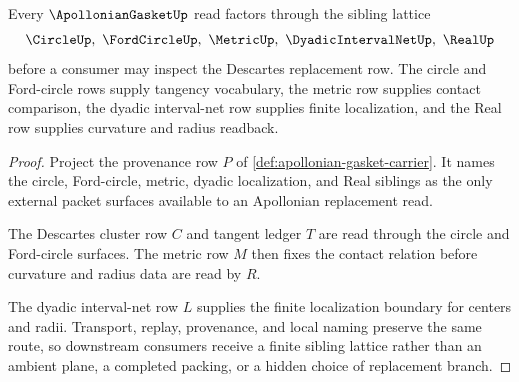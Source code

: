 \begin{theorem}
\label{thm:apollonian-gasket-sibling-lattice}
Every $\ApollonianGasketUp$ read factors through the sibling lattice
$$
\CircleUp,\ \FordCircleUp,\ \MetricUp,\ \DyadicIntervalNetUp,\ \RealUp
$$
before a consumer may inspect the Descartes replacement row. The circle and Ford-circle rows supply tangency vocabulary, the metric row supplies contact comparison, the dyadic interval-net row supplies finite localization, and the Real row supplies curvature and radius readback.
\end{theorem}
\begin{proof}
Project the provenance row $P$ of \autoref{def:apollonian-gasket-carrier}. It names the circle, Ford-circle, metric, dyadic localization, and Real siblings as the only external packet surfaces available to an Apollonian replacement read.

The Descartes cluster row $C$ and tangent ledger $T$ are read through the circle and Ford-circle surfaces. The metric row $M$ then fixes the contact relation before curvature and radius data are read by $R$.

The dyadic interval-net row $L$ supplies the finite localization boundary for centers and radii. Transport, replay, provenance, and local naming preserve the same route, so downstream consumers receive a finite sibling lattice rather than an ambient plane, a completed packing, or a hidden choice of replacement branch.
\end{proof}




